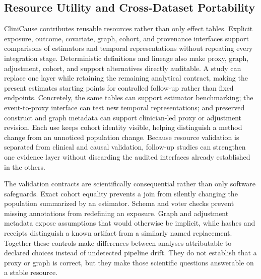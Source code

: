 \documentclass[letterpaper]{article}
\begin{document}
\subsection{Resource Utility and Cross-Dataset Portability}

CliniCause contributes reusable resources rather than only effect tables.
Explicit exposure, outcome, covariate, graph, cohort, and provenance interfaces
support comparisons of estimators and temporal representations without repeating
every integration stage. Deterministic definitions and lineage also make proxy,
graph, adjustment, cohort, and support alternatives directly auditable. A study
can replace one layer while retaining the remaining analytical contract, making
the present estimates starting points for controlled follow-up rather than
fixed endpoints. Concretely, the same tables can support estimator benchmarking;
the event-to-proxy interface can test new temporal representations; and preserved
construct and graph metadata can support clinician-led proxy or adjustment
revision. Each use keeps cohort identity visible, helping distinguish a method
change from an unnoticed population change.
Because resource validation is separated from clinical and causal validation,
follow-up studies can strengthen one evidence layer without discarding the
audited interfaces already established in the others.

The validation contracts are scientifically consequential rather than only
software safeguards. Exact cohort equality prevents a join from silently
changing the population summarized by an estimator. Schema and voter checks
prevent missing annotations from redefining an exposure. Graph and adjustment
metadata expose assumptions that would otherwise be implicit, while hashes and
receipts distinguish a known artifact from a similarly named replacement.
Together these controls make differences between analyses attributable to
declared choices instead of undetected pipeline drift. They do not establish
that a proxy or graph is correct, but they make those scientific questions
answerable on a stable resource.
\end{document}
